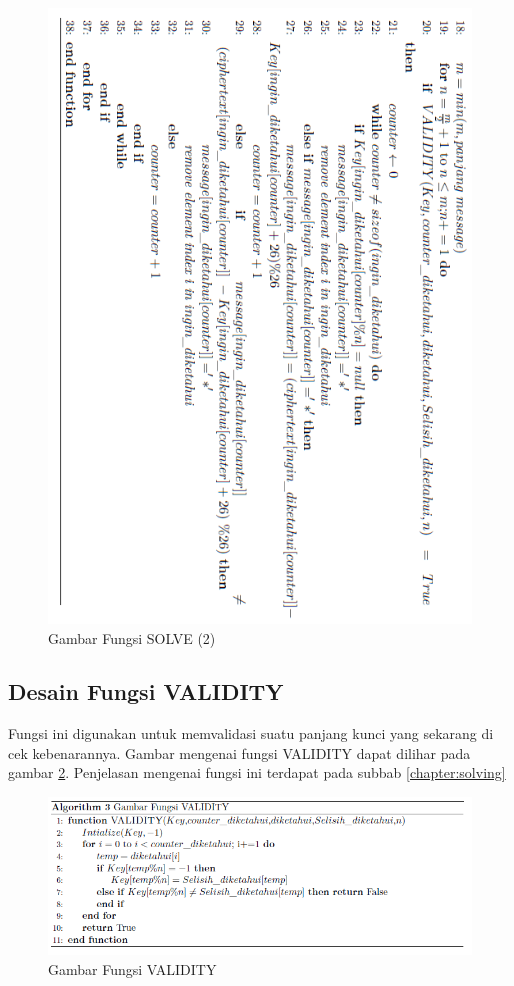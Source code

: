 	\begin{figure}[H]
		\centering
		\includegraphics[scale=0.62]{images/bab3/solvefx2.png}
		\caption{Gambar Fungsi SOLVE (2)}
		\label{fig:solvefx}
	\end{figure}
	\subsection{Desain Fungsi VALIDITY}
	Fungsi ini digunakan untuk memvalidasi suatu panjang kunci yang sekarang di cek kebenarannya. Gambar mengenai fungsi VALIDITY dapat dilihar pada gambar \ref{fig:validity}. Penjelasan mengenai fungsi ini terdapat pada subbab \ref{chapter:solving}
	
 \begin{figure}[H]
		\centering
		\includegraphics[scale=0.5]{images/bab3/validity.png}
		\caption{Gambar Fungsi VALIDITY}
		\label{fig:validity}
	\end{figure}